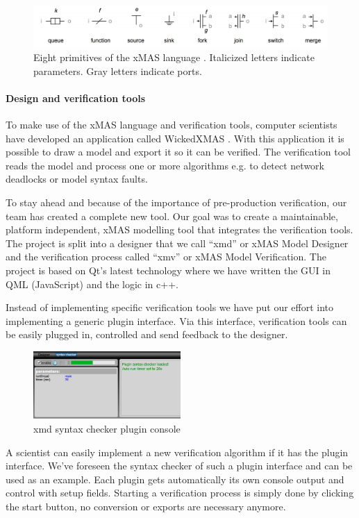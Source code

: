 \begin{figure}[here]
\includegraphics[width=1.0\textwidth]{xmas-language}
\caption{Eight primitives of the xMAS language \cite{6225465}. Italicized letters indicate
parameters. Gray letters indicate ports.}
\label{fig:xmas-language}
\end{figure}

\paragraph{Design and verification tools}

To make use of the xMAS language and verification tools, computer scientists
have developed an application called WickedXMAS \cite{WickedXmas}.
With this application it is possible to draw a model and export it so it can be
verified. The verification tool reads the model and process one or more
algorithms e.g. to detect network deadlocks or model syntax faults.

To stay ahead and because of the importance of pre-production verification, our
team has created a complete new tool. Our goal was to create a maintainable,
platform independent, xMAS modelling tool that integrates the verification
tools. The project is split into a designer that we call ``xmd'' or xMAS Model
Designer and the verification process called ``xmv'' or xMAS Model Verification. The
project is based on Qt's latest technology where we have written the GUI in QML
(JavaScript) and the logic in c++.

Instead of implementing specific verification tools we have put our effort into
implementing a generic plugin interface. Via this interface, verification tools
can be easily plugged in, controlled and send feedback to the designer. 
\begin{figure}
  \vspace{-20pt}
  \begin{center}
    \includegraphics[width=0.50\textwidth]{console}
  \end{center}
  \vspace{-20pt}
  \caption{xmd syntax checker plugin console}
  \label{fig:console}
  \vspace{-10pt}
\end{figure}
A scientist can easily implement a new verification algorithm if it has the plugin
interface. We've foreseen the syntax checker of such a plugin interface and can
be used as an example. 
Each plugin gets automatically its own console output and
control with setup fields. Starting a verification process is simply done by
clicking the start button, no conversion or exports are necessary anymore.


